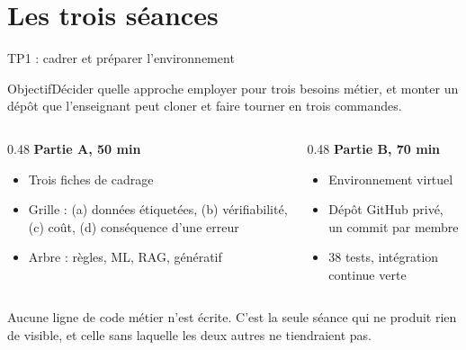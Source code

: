 \documentclass[aspectratio=169,11pt]{beamer}
\newcommand{\objectif}[1]{\begin{block}{Objectif}#1\end{block}}
\begin{document}
\section{Les trois séances}

\begin{frame}{TP1 : cadrer et préparer l'environnement}
\objectif{Décider quelle approche employer pour trois besoins métier, et monter un dépôt que
l'enseignant peut cloner et faire tourner en trois commandes.}
\begin{columns}[T,onlytextwidth]
\begin{column}{0.48\textwidth}
\textbf{Partie A, 50 min}
\begin{itemize}\small
  \item Trois fiches de cadrage
  \item Grille : (a) données étiquetées, (b) vérifiabilité, (c) coût, (d) conséquence d'une erreur
  \item Arbre : règles, ML, RAG, génératif
\end{itemize}
\end{column}
\begin{column}{0.48\textwidth}
\textbf{Partie B, 70 min}
\begin{itemize}\small
  \item Environnement virtuel
  \item Dépôt GitHub privé, un commit par membre
  \item 38 tests, intégration continue verte
\end{itemize}
\end{column}
\end{columns}
\vspace{5pt}
\centering\small
Aucune ligne de code métier n'est écrite. C'est la seule séance qui ne produit rien de visible,
et celle sans laquelle les deux autres ne tiendraient pas.
\end{frame}
\end{document}
